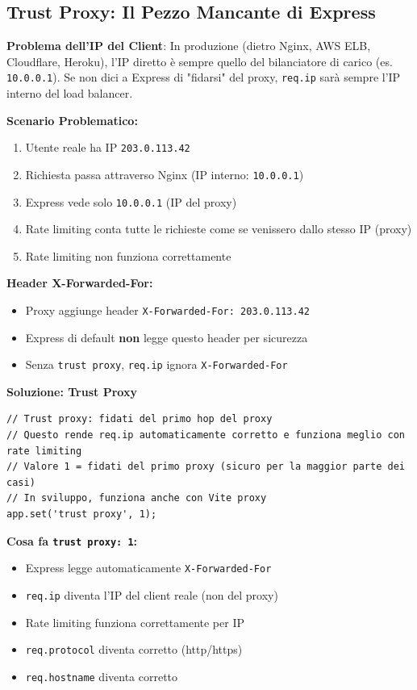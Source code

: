 \documentclass[11pt,a4paper]{article}
\newcommand{\code}[1]{\texttt{#1}}
\newcommand{\important}[1]{\textcolor{red!80!black}{\textbf{#1}}}
\begin{document}
\subsection{Trust Proxy: Il Pezzo Mancante di Express}

\important{Problema dell'IP del Client}: In produzione (dietro Nginx, AWS ELB, Cloudflare, Heroku), l'IP diretto è sempre quello del bilanciatore di carico (es. \code{10.0.0.1}). Se non dici a Express di "fidarsi" del proxy, \code{req.ip} sarà sempre l'IP interno del load balancer.

\textbf{Scenario Problematico:}
\begin{enumerate}
    \item Utente reale ha IP \code{203.0.113.42}
    \item Richiesta passa attraverso Nginx (IP interno: \code{10.0.0.1})
    \item Express vede solo \code{10.0.0.1} (IP del proxy)
    \item Rate limiting conta tutte le richieste come se venissero dallo stesso IP (proxy)
    \item Rate limiting non funziona correttamente
\end{enumerate}

\textbf{Header X-Forwarded-For:}
\begin{itemize}
    \item Proxy aggiunge header \code{X-Forwarded-For: 203.0.113.42}
    \item Express di default \important{non} legge questo header per sicurezza
    \item Senza \code{trust proxy}, \code{req.ip} ignora \code{X-Forwarded-For}
\end{itemize}

\textbf{Soluzione: Trust Proxy}

\begin{lstlisting}[caption=Configurazione Trust Proxy]
// Trust proxy: fidati del primo hop del proxy
// Questo rende req.ip automaticamente corretto e funziona meglio con rate limiting
// Valore 1 = fidati del primo proxy (sicuro per la maggior parte dei casi)
// In sviluppo, funziona anche con Vite proxy
app.set('trust proxy', 1);
\end{lstlisting}

\textbf{Cosa fa \code{trust proxy: 1}:}
\begin{itemize}
    \item Express legge automaticamente \code{X-Forwarded-For}
    \item \code{req.ip} diventa l'IP del client reale (non del proxy)
    \item Rate limiting funziona correttamente per IP
    \item \code{req.protocol} diventa corretto (http/https)
    \item \code{req.hostname} diventa corretto
\end{itemize}
\end{document}
